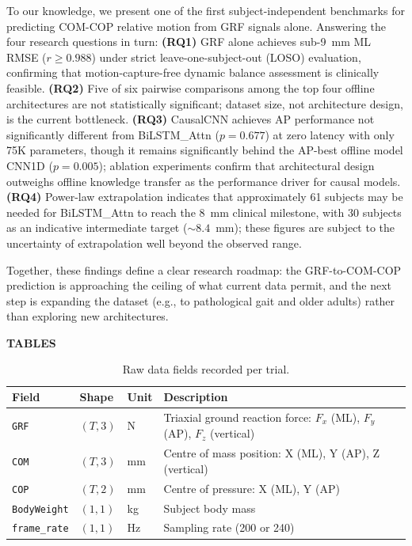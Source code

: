 \documentclass[preprint,12pt]{elsarticle}
\begin{document}
To our knowledge, we present one of the first subject-independent benchmarks
for predicting COM-COP relative motion from GRF signals alone.
Answering the four research questions in turn:
\textbf{(RQ1)} GRF alone achieves sub-9~mm ML RMSE ($r \geq 0.988$) under
strict leave-one-subject-out (LOSO) evaluation, confirming that motion-capture-free
dynamic balance assessment is clinically feasible.
\textbf{(RQ2)} Five of six pairwise comparisons among the top four offline
architectures are not statistically significant; dataset size, not architecture
design, is the current bottleneck.
\textbf{(RQ3)} CausalCNN achieves AP performance not significantly different from
BiLSTM\_Attn ($p = 0.677$) at zero latency with only 75K parameters, though it
remains significantly behind the AP-best offline model CNN1D ($p = 0.005$);
ablation experiments confirm that architectural design outweighs offline knowledge
transfer as the performance driver for causal models.
\textbf{(RQ4)} Power-law extrapolation indicates that approximately 61 subjects may
be needed for BiLSTM\_Attn to reach the 8~mm clinical milestone, with 30 subjects
as an indicative intermediate target (${\sim}8.4$~mm); these figures are subject to
the uncertainty of extrapolation well beyond the observed range.

Together, these findings define a clear research roadmap: the GRF-to-COM-COP
prediction is approaching the ceiling of what current data permit, and the
next step is expanding the dataset (e.g., to pathological gait and older adults)
rather than exploring new architectures.




\clearpage
\begin{center}
{\normalfont\large\bfseries TABLES}
\end{center}

\begin{table}[H]
\centering
\caption{Raw data fields recorded per trial.}
\label{tab:fields}
\begin{tabular}{llll}
\toprule
Field & Shape & Unit & Description \\
\midrule
\texttt{GRF} & $(T, 3)$ & N   & Triaxial ground reaction force: $F_x$ (ML), $F_y$ (AP), $F_z$ (vertical) \\
\texttt{COM} & $(T, 3)$ & mm  & Centre of mass position: X (ML), Y (AP), Z (vertical) \\
\texttt{COP} & $(T, 2)$ & mm  & Centre of pressure: X (ML), Y (AP) \\
\texttt{BodyWeight} & $(1,1)$ & kg & Subject body mass \\
\texttt{frame\_rate} & $(1,1)$ & Hz & Sampling rate (200 or 240) \\
\bottomrule
\end{tabular}
\end{table}
\end{document}
